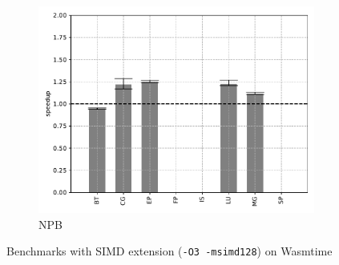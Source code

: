 \begin{figure}
\begin{subfigure}[t]{.45\textwidth}
        \includegraphics[width=\textwidth]
        {Images/6.1.RQ1/npb-wasmtime-simd.pdf}
        \caption{NPB}
    \end{subfigure}
    \caption{Benchmarks with SIMD extension (\texttt{-O3 -msimd128}) on Wasmtime}
    \label{fig:rq1-wasmtime-simd}
\end{figure}

